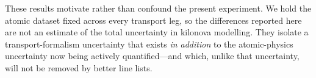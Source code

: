 \documentclass[fleqn,usenatbib]{mnras}
\begin{document}
These results motivate rather than confound the present experiment. We hold
the atomic dataset fixed across every transport leg, so the differences
reported here are not an estimate of the total uncertainty in kilonova
modelling. They isolate a transport-formalism uncertainty that exists
\emph{in addition} to the atomic-physics uncertainty now being actively
quantified---and which, unlike that uncertainty, will not be removed by
better line lists.




\label{lastpage}
\end{document}
